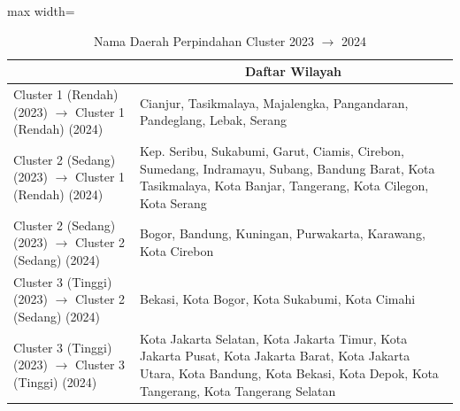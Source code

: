 \begin{table}[H]
\centering
\caption{Nama Daerah Perpindahan Cluster 2023 \(\rightarrow\) 2024} \label{tab:app1transname2023x2024}
\begin{adjustbox}{max width=\textwidth}
\begin{tabular}{|>{\centering\arraybackslash}p{4cm}|p{10cm}|}
\hline
\multicolumn{1}{|c|}{\textbf{Kategori}} & \multicolumn{1}{c|}{\textbf{Daftar Wilayah}} \\
\hline
Cluster 1 (Rendah) (2023) \(\rightarrow\) Cluster 1 (Rendah) (2024) & Cianjur, Tasikmalaya, Majalengka, Pangandaran, Pandeglang, Lebak, Serang \\
\hline
Cluster 2 (Sedang) (2023) \(\rightarrow\) Cluster 1 (Rendah) (2024) & Kep. Seribu, Sukabumi, Garut, Ciamis, Cirebon, Sumedang, Indramayu, Subang, Bandung Barat, Kota Tasikmalaya, Kota Banjar, Tangerang, Kota Cilegon, Kota Serang \\
\hline
Cluster 2 (Sedang) (2023) \(\rightarrow\) Cluster 2 (Sedang) (2024) & Bogor, Bandung, Kuningan, Purwakarta, Karawang, Kota Cirebon \\
\hline
Cluster 3 (Tinggi) (2023) \(\rightarrow\) Cluster 2 (Sedang) (2024) & Bekasi, Kota Bogor, Kota Sukabumi, Kota Cimahi \\
\hline
Cluster 3 (Tinggi) (2023) \(\rightarrow\) Cluster 3 (Tinggi) (2024) & Kota Jakarta Selatan, Kota Jakarta Timur, Kota Jakarta Pusat, Kota Jakarta Barat, Kota Jakarta Utara, Kota Bandung, Kota Bekasi, Kota Depok, Kota Tangerang, Kota Tangerang Selatan \\
\hline
\end{tabular}
\end{adjustbox}
\end{table}